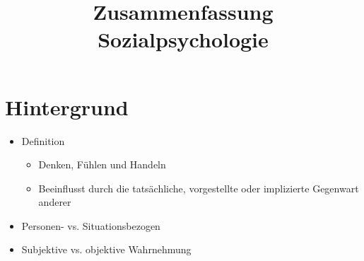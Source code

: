 \documentclass[11pt, paper=a4, twocolumn]{scrartcl}
\title{\vspace{-1.25cm}Zusammenfassung Sozialpsychologie\vspace{-0.25cm}}
\date{\vspace{-5ex}}
\begin{document}
	\maketitle


	\section{Hintergrund}
		\begin{itemize}
			\item Definition
				\begin{itemize}
					\item Denken, Fühlen und Handeln
					\item Beeinflusst durch die tatsächliche, vorgestellte oder implizierte Gegenwart anderer
				\end{itemize}
			\item Personen- vs. Situationsbezogen
			\item Subjektive vs. objektive Wahrnehmung
		\end{itemize}
\end{document}
